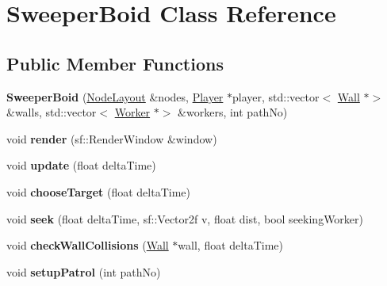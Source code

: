 \hypertarget{class_sweeper_boid}{}\section{Sweeper\+Boid Class Reference}
\label{class_sweeper_boid}
\subsection*{Public Member Functions}
\begin{DoxyCompactItemize}
\item 
\mbox{\label{class_sweeper_boid_a1beb859233e11e9656ce5b501ee739d0}} 
{\bfseries Sweeper\+Boid} (\mbox{\hyperlink{class_node_layout}{Node\+Layout}} \&nodes, \mbox{\hyperlink{class_player}{Player}} $\ast$player, std\+::vector$<$ \mbox{\hyperlink{class_wall}{Wall}} $\ast$$>$ \&walls, std\+::vector$<$ \mbox{\hyperlink{class_worker}{Worker}} $\ast$$>$ \&workers, int path\+No)
\item 
\mbox{\label{class_sweeper_boid_a060fdd3341601b642bec5f298525acc3}} 
void {\bfseries render} (sf\+::\+Render\+Window \&window)
\item 
\mbox{\label{class_sweeper_boid_ace06cb07304ac46df07e70ff77cec967}} 
void {\bfseries update} (float delta\+Time)
\item 
\mbox{\label{class_sweeper_boid_a40ddb4df0d84f897c5c8e831f5e536e9}} 
void {\bfseries choose\+Target} (float delta\+Time)
\item 
\mbox{\label{class_sweeper_boid_ab88569c90abe8ffea6d199d1c4d25fdf}} 
void {\bfseries seek} (float delta\+Time, sf\+::\+Vector2f v, float dist, bool seeking\+Worker)
\item 
\mbox{\label{class_sweeper_boid_a718a85eabf5b4e7e8361ae0e4fd70fec}} 
void {\bfseries check\+Wall\+Collisions} (\mbox{\hyperlink{class_wall}{Wall}} $\ast$wall, float delta\+Time)
\item 
\mbox{\label{class_sweeper_boid_ae2e5c623aa6d8675eddf5ba2470539cb}} 
void {\bfseries setup\+Patrol} (int path\+No)
\item 
\mbox{\label{class_sweeper_boid_ad0bba56551cd9fa781c8d04fc6c1c361}} 

\end{DoxyCompactItemize}

